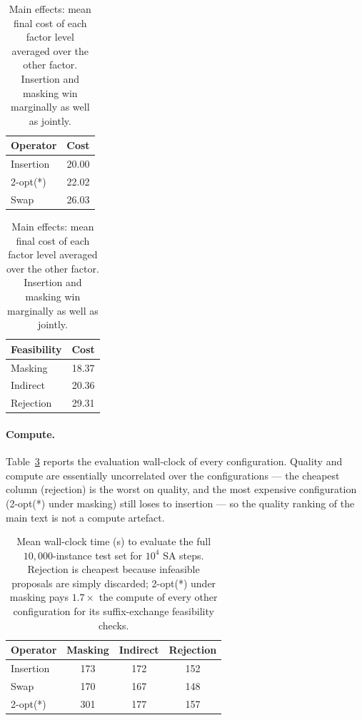 \documentclass[letterpaper]{article} %
\begin{document}
\begin{table}[t]
\centering
\small
\begin{minipage}{0.48\columnwidth}\centering
\begin{tabular}{lc}
\toprule
\textbf{Operator} & \textbf{Cost} \\
\midrule
Insertion & 20.00 \\
2-opt(*)  & 22.02 \\
Swap      & 26.03 \\
\bottomrule
\end{tabular}
\end{minipage}\hfill
\begin{minipage}{0.48\columnwidth}\centering
\begin{tabular}{lc}
\toprule
\textbf{Feasibility} & \textbf{Cost} \\
\midrule
Masking   & 18.37 \\
Indirect  & 20.36 \\
Rejection & 29.31 \\
\bottomrule
\end{tabular}
\end{minipage}
\caption{Main effects: mean final cost of each factor level averaged over the other factor. Insertion and masking win marginally as well as jointly.}
\label{tab:v1main}
\end{table}

\paragraph{Compute.}
Table~\ref{tab:v1time} reports the evaluation wall-clock of every configuration. Quality and compute are essentially uncorrelated over the configurations --- the cheapest column (rejection) is the worst on quality, and the most expensive configuration (2-opt(*) under masking) still loses to insertion --- so the quality ranking of the main text is not a compute artefact.

\begin{table}[t]
\centering
\small
\begin{tabular}{lccc}
\toprule
\textbf{Operator} & \textbf{Masking} & \textbf{Indirect} & \textbf{Rejection} \\
\midrule
Insertion & 173 & 172 & 152 \\
Swap      & 170 & 167 & 148 \\
2-opt(*)  & 301 & 177 & 157 \\
\bottomrule
\end{tabular}
\caption{Mean wall-clock time (s) to evaluate the full $10{,}000$-instance test set for $10^4$ SA steps. Rejection is cheapest because infeasible proposals are simply discarded; 2-opt(*) under masking pays $1.7\times$ the compute of every other configuration for its suffix-exchange feasibility checks.}
\label{tab:v1time}
\end{table}
\end{document}
